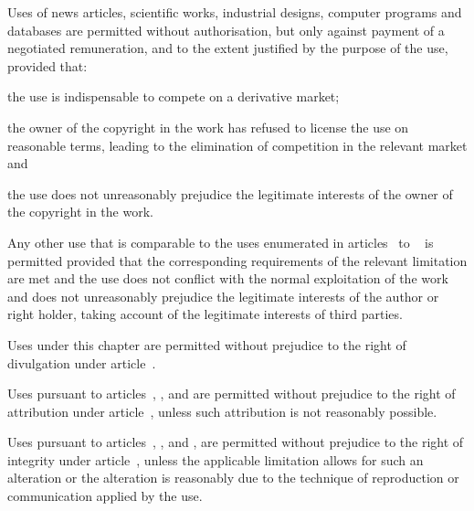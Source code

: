 \begin{contract}
\Sentence Uses of news articles, scientific works, industrial designs, computer
programs and databases are permitted without authorisation, but only
against payment of a negotiated remuneration, and to the extent
justified by the purpose of the use, provided that:
\begin{legalenum}
	\item the use is indispensable to compete on a derivative market;
	\item the owner of the copyright in the work has refused to license the use
				on reasonable terms, leading to the elimination of competition in the
				relevant market and
	\item the use does not unreasonably prejudice the legitimate interests of the
				owner of the copyright in the work.
\end{legalenum}

\label{Par:FurtherLimitations}
\Sentence Any other use that is comparable to the uses enumerated in articles~ to ~
is permitted provided that the corresponding requirements of the relevant
limitation are met and the use does not conflict with the normal exploitation
of the work and does not unreasonably prejudice the legitimate interests of
the author or right holder, taking account of the legitimate interests of third
parties.

\label{Par:RelationWithMoralRights}
\Sentence Uses under this chapter are permitted without prejudice to the right of
divulgation under article~.

\Sentence Uses pursuant to articles~, ,  and  are permitted without prejudice to the right of attribution under article~, unless such attribution is not reasonably possible.

\Sentence Uses pursuant to articles~, ,  and , are permitted without
prejudice to the right of integrity under article~, unless the applicable
limitation allows for such an alteration or the alteration is reasonably due
to the technique of reproduction or communication applied by the use.


\end{contract}
